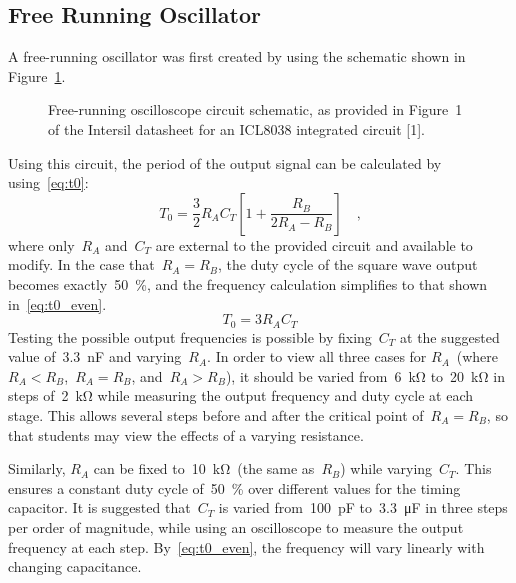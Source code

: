 \subsection{Free Running Oscillator}
A free-running oscillator was first created by using the schematic shown in
Figure~\ref{fig:free_run}.
%
\begin{figure}[H]
	\centering
	
	\parbox{.6\textwidth}{
	\caption[Free Running Oscillator Schematic]{Free-running oscilloscope circuit schematic, as provided in Figure~1 of the
	Intersil datasheet for an ICL8038 integrated circuit [1].}
	\label{fig:free_run}}
\end{figure}
%
Using this circuit, the period of the output signal can be calculated by using~\eqref{eq:t0}:
%
\begin{equation}
	T_0 = \frac{3}{2} R_A C_T \left[ 1 + \frac{R_B}{2R_A - R_B} \right] \quad \text{,}
	\label{eq:t0}
\end{equation}
%
where only~$R_A$ and~$C_T$ are external to the provided circuit and available
to modify.  In the case that~$R_A = R_B$, the duty cycle of the square wave
output becomes exactly~\SI{50}{\percent}, and the frequency calculation
simplifies to that shown in~\eqref{eq:t0_even}.
%
\begin{equation}
	T_0 = 3 R_A C_T
	\label{eq:t0_even}
\end{equation}
%
Testing the possible output frequencies is possible by fixing~$C_T$ at the
suggested value of~\SI{3.3}{\nano\farad} and varying~$R_A$.  In order to view
all three cases for $R_A$~(where~$R_A < R_B$,~$R_A = R_B$, and~$R_A > R_B$), it
should be varied from~\SI{6}{\kilo\ohm} to~\SI{20}{\kilo\ohm} in steps
of~\SI{2}{\kilo\ohm} while measuring the output frequency and duty cycle at
each stage.  This allows several steps before and after the critical point
of~$R_A = R_B$, so that students may view the effects of a varying resistance.

Similarly, $R_A$ can be fixed to~\SI{10}{\kilo\ohm}~(the same as~$R_B$) while
varying~$C_T$.  This ensures a constant duty cycle of~\SI{50}{\percent} over
different values for the timing capacitor.  It is suggested that~$C_T$ is
varied from~\SI{100}{\pico\farad} to~\SI{3.3}{\micro\farad} in three steps per
order of magnitude, while using an oscilloscope to measure the output frequency
at each step.  By~\eqref{eq:t0_even}, the frequency will vary linearly with
changing capacitance.


